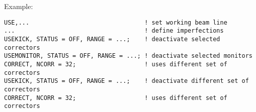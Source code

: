 Example:                                                                  

\begin{verbatim}
USE,...                                ! set working beam line 
...                                    ! define imperfections 
USEKICK, STATUS = OFF, RANGE = ...;    ! deactivate selected correctors 
USEMONITOR, STATUS = OFF, RANGE = ...; ! deactivate selected monitors   
CORRECT, NCORR = 32;                   ! uses different set of correctors
USEKICK, STATUS = OFF, RANGE = ...;    ! deactivate different set of correctors 
CORRECT, NCORR = 32;                   ! uses different set of correctors
\end{verbatim}

